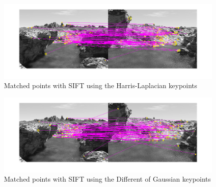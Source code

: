 \documentclass{article}
\begin{document}
\begin{figure}[ht]
\centering
\includegraphics[width=\textwidth]{img/matchesLaplace.png}
\caption{Matched points with SIFT using the Harris-Laplacian keypoints}
\label{fig:matching}
\end{figure}

\begin{figure}[ht]
\centering
\includegraphics[width=\textwidth]{img/matchesDoG.png}
\caption{Matched points with SIFT using the Different of Gaussian keypoints}
\label{fig:matDoG}
\end{figure}

{}

\end{document}
